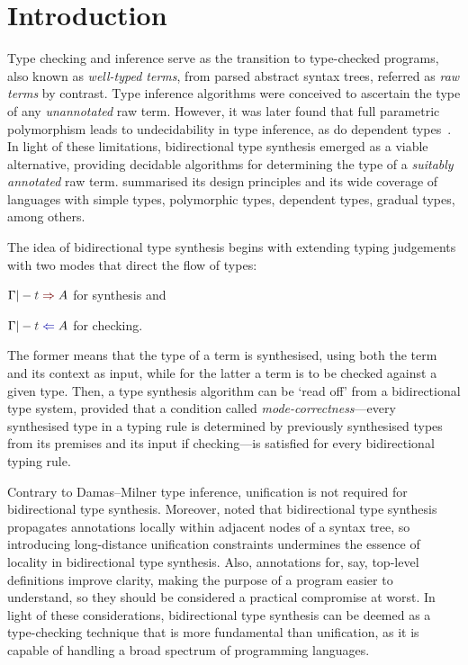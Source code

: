 
\section{Introduction}\label{sec:intro}

Type checking and inference serve as the transition to type-checked programs, also known as \emph{well-typed terms}, from parsed abstract syntax trees, referred as \emph{raw terms} by contrast.
Type inference algorithms were conceived to ascertain the type of any \emph{unannotated} raw term.
However, it was later found that full parametric polymorphism leads to undecidability in type inference, as do dependent types~\citep{Wells1999,Dowek1993}.
In light of these limitations, bidirectional type synthesis emerged as a viable alternative, providing decidable algorithms for determining the type of a \emph{suitably annotated} raw term.
\citet{Dunfield2021} summarised its design principles and its wide coverage of languages with simple types, polymorphic types, dependent types, gradual types, among others. 

The idea of bidirectional type synthesis begins with extending typing judgements with two modes that direct the flow of types:
\begin{enumerate*}
  \item $\Gamma |- \isTerm{t} \syn A$ for synthesis and 
  \item $\Gamma |- \isTerm{t} \chk A$ for checking.
\end{enumerate*}
The former means that the type of a term is synthesised, using both the term and its context as input, while for the latter a term is to be checked against a given type.
Then, a type synthesis algorithm can be `read off' from a bidirectional type system, provided that a condition called \emph{mode-correctness}---every synthesised type in a typing rule is determined by previously synthesised types from its premises and its input if checking---is satisfied for every bidirectional typing rule.


Contrary to Damas--Milner type inference, unification is not required for bidirectional type synthesis.
Moreover, \citet{Pierce2000} noted that bidirectional type synthesis propagates annotations locally within adjacent nodes of a syntax tree, so introducing long-distance unification constraints undermines the essence of locality in bidirectional type synthesis.
Also, annotations for, say, top-level definitions improve clarity, making the purpose of a program easier to understand, so they should be considered a practical compromise at worst.
In light of these considerations, bidirectional type synthesis can be deemed as a type-checking technique that is more fundamental than unification, as it is capable of handling a broad spectrum of programming languages. 

